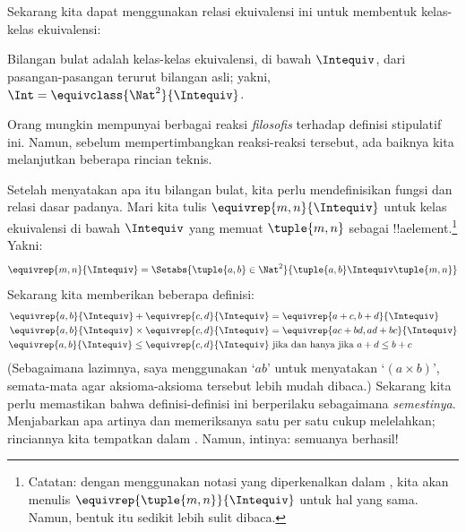 \documentclass[../../../include/open-logic-section]{subfiles}
\begin{document}
Sekarang kita dapat menggunakan relasi ekuivalensi ini untuk membentuk kelas-kelas ekuivalensi:

\begin{defn}
		Bilangan bulat adalah kelas-kelas ekuivalensi, di bawah $\Intequiv$, dari pasangan-pasangan terurut bilangan asli; yakni, $\Int = \equivclass{\Nat^2}{\Intequiv}$.
\end{defn}

Orang mungkin mempunyai berbagai reaksi \emph{filosofis} terhadap definisi stipulatif ini. Namun, sebelum mempertimbangkan reaksi-reaksi tersebut, ada baiknya kita melanjutkan beberapa rincian teknis.

Setelah menyatakan apa itu bilangan bulat, kita perlu mendefinisikan fungsi dan relasi dasar padanya. Mari kita tulis $\equivrep{m, n}{\Intequiv}$ untuk kelas ekuivalensi di bawah $\Intequiv$ yang memuat $\tuple{m, n}$ sebagai !!a{element}.\footnote{Catatan: dengan menggunakan notasi yang diperkenalkan dalam , kita akan menulis $\equivrep{\tuple{m,n}}{\Intequiv}$ untuk hal yang sama. Namun, bentuk itu sedikit lebih sulit dibaca.} Yakni:
	$$\equivrep{m, n}{\Intequiv} = \Setabs{\tuple{a, b} \in \Nat^2}{\tuple{a, b}\Intequiv \tuple{m, n}}$$
Sekarang kita memberikan beberapa definisi:
	\begin{align*}
		\equivrep{a, b}{\Intequiv} + \equivrep{c, d}{\Intequiv} &= \equivrep{a + c, b + d}{\Intequiv}\\
		\equivrep{a, b}{\Intequiv} \times \equivrep{c, d}{\Intequiv} &= \equivrep{a c + b  d, a  d + b c}{\Intequiv}\\
		\equivrep{a, b}{\Intequiv} \leq \equivrep{c, d}{\Intequiv} &\text{ jika dan hanya jika }a + d \leq b + c
	\end{align*}
(Sebagaimana lazimnya, saya menggunakan `$ab$' untuk menyatakan `$(a \times b)$', semata-mata agar aksioma-aksioma tersebut lebih mudah dibaca.) Sekarang kita perlu memastikan bahwa definisi-definisi ini berperilaku sebagaimana \emph{semestinya}. Menjabarkan apa artinya dan memeriksanya satu per satu cukup melelahkan; rinciannya kita tempatkan dalam . Namun, intinya: semuanya berhasil!
\end{document}
